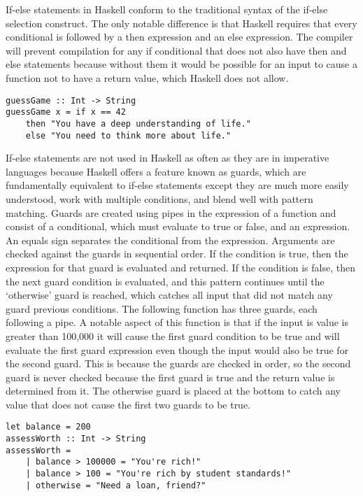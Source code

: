 \documentclass[titlepage,12pt]{article}
\begin{document}
If-else statements in Haskell conform to the traditional syntax of the if-else selection construct. The only notable difference is that Haskell requires that every conditional is followed by a then expression and an else expression. The compiler will prevent compilation for any if conditional that does not also have then and else statements because without them it would be possible for an input to cause a function not to have a return value, which Haskell does not allow.

\begin{verbatim}
guessGame :: Int -> String
guessGame x = if x == 42
    then "You have a deep understanding of life."
    else "You need to think more about life."
\end{verbatim}

If-else statements are not used in Haskell as often as they are in imperative languages because Haskell offers a feature known as guards, which are fundamentally equivalent to if-else statements except they are much more easily understood, work with multiple conditions, and blend well with pattern matching. Guards are created using pipes in the expression of a function and consist of a conditional, which must evaluate to true or false, and an expression. An equals sign separates the conditional from the expression. Arguments are checked against the guards in sequential order. If the condition is true, then the expression for that guard is evaluated and returned. If the condition is false, then the next guard condition is evaluated, and this pattern continues until the `otherwise' guard is reached, which catches all input that did not match any guard previous conditions. The following function has three guards, each following a pipe. A notable aspect of this function is that if the input is value is greater than 100,000 it will cause the first guard condition to be true and will evaluate the first guard expression even though the input would also be true for the second guard. This is because the guards are checked in order, so the second guard is never checked because the first guard is true and the return value is determined from it. The otherwise guard is placed at the bottom to catch any value that does not cause the first two guards to be true. 

\begin{verbatim}
let balance = 200
assessWorth :: Int -> String
assessWorth =
    | balance > 100000 = "You're rich!"
    | balance > 100 = "You're rich by student standards!"
    | otherwise = "Need a loan, friend?"
\end{verbatim}
\end{document}
